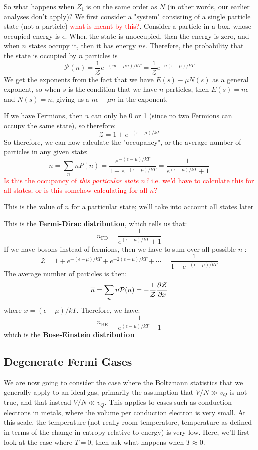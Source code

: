 \documentclass[10pt]{article}
\newcommand{\question}[1]{\textcolor{red}{#1}}
\newcommand{\answer}[1]{\textcolor{green!80!black!}{#1}}
\renewcommand{\comment}[1]{\textcolor{blue!50}{#1}}
\begin{document}
	So what happens when \( Z_1 \) is on the same order as \( N \) (in other words, our earlier analyses don't apply)? We first 
	consider a "system" consisting of a single particle state (not a particle) \question{what is meant by this?}. Consider 
	a particle in a box, whose occupied energy is \( \epsilon \). When the state is unoccupied, then the energy is zero, 
	and when \( n \) states occupy it, then it has energy \( n \epsilon \). Therefore, the probability that 
	the state is occupied by \( n \) particles is 
	\[
	\mathcal P(n) = \frac{1}{\mathcal Z} e^{-(n \epsilon - \mu n) / kT} = \frac{1}{\mathcal Z} e^{-n(\epsilon - \mu) / kT}
	\] 
	\comment{We get the exponents from the fact that we have \( E(s) - \mu N(s) \) as a general exponent, so when \( s \) is the 
		condition that we have \( n \) particles, then \( E(s) = n \epsilon \) and \( N(s) = n \), giving us a 
	\( n \epsilon - \mu n \) in the exponent.}
	
	If we have Fermions, then \( n \) can only be 0 or 1 (since no two Fermions can occupy the same state), so therefore:
	\[
	\mathcal Z = 1 + e^{-(\epsilon - \mu) / kT}
	\] 
	So therefore, we can now calculate the "occupancy", or the average number of particles in any given state:
	\[
	\overline n = \sum_n n P(n) = \frac{e^{-(\epsilon - \mu) / kT}}{1 + e^{-(\epsilon - \mu) / kT}} = 
	\frac{1}{e^{(\epsilon - \mu) / kT} + 1}
	\] 
	\question{Is this the occupancy of \textit{this particular state \( n \)?} i.e. we'd have to calculate this for all states, 
	or is this somehow calculating for all \( n \)?}

	\answer{This is the value of \( \overline n \) for a particular state; we'll take into account all states later}

	This is the \textbf{Fermi-Dirac distribution}, which tells us that:
	\[
	\overline n_{\text{FD}} = \frac{1}{e^{(\epsilon - \mu) / kT} + 1}
	\]
	If we have bosons instead of fermions, then we have to sum over all possible \( n \) :
	\[
	\mathcal Z = 1 + e^{-(\epsilon - \mu) / kT} + e^{-2(\epsilon - \mu) / kT} + \cdots = \frac{1}{1-e^{-(\epsilon - \mu) / kT}}
	\] 
	The average number of particles is then:
	\[
		\overline n = \sum_n n \mathcal P(n) = -\frac{1}{\mathcal Z} \pdv{\mathcal Z}{x}
	\] 
	where \( x = (\epsilon - \mu) / kT \). Therefore, we have:
	\[
	\overline n_{\text{BE}} = \frac{1}{e^{(\epsilon - \mu) /kT} - 1}
	\] 
	which is the \textbf{Bose-Einstein distribution}

	\subsection{Degenerate Fermi Gases}
	We are now going to consider the case where the Boltzmann statistics that we generally apply to an ideal gas, primarily 
	the assumption that \( V / N \gg v_Q \) is not true, and that instead \( V / N \ll v_Q \). This applies to cases 
	such as conduction electrons in metals, where the volume per conduction electron is very small. At this scale, the temperature
	(not really room temperature, temperature as defined in terms of the change in entropy relative to energy) is very 
	low. Here, we'll first look at the case where \( T = 0 \), then ask what happens when \( T \approx 0 \). 
\end{document}
